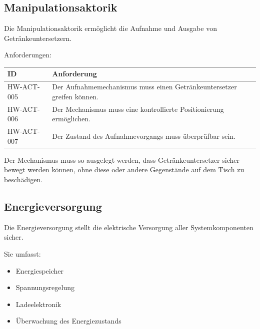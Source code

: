 \documentclass[
  a4paper,
  12pt,
  DIV=12,        %
  parskip=half,  %
  headings=small %
]{scrartcl}
\theoremstyle{definition}
\providecommand{\tightlist}{%
  \setlength{\itemsep}{0pt}\setlength{\parskip}{0pt}}
\theoremstyle{definition}
\begin{document}
\subsection{Manipulationsaktorik}\label{manipulationsaktorik}

Die Manipulationsaktorik ermöglicht die Aufnahme und Ausgabe von
Getränkeuntersetzern.

Anforderungen:

\begin{longtable}[]{@{}
  >{\raggedright\arraybackslash}p{}
  >{\raggedright\arraybackslash}p{}@{}}
\toprule\noalign{}
\begin{minipage}[b]{\linewidth}\raggedright
ID
\end{minipage} & \begin{minipage}[b]{\linewidth}\raggedright
Anforderung
\end{minipage} \\
\midrule\noalign{}
\endhead
\bottomrule\noalign{}
\endlastfoot
HW-ACT-005 & Der Aufnahmemechanismus muss einen Getränkeuntersetzer
greifen können. \\
HW-ACT-006 & Der Mechanismus muss eine kontrollierte Positionierung
ermöglichen. \\
HW-ACT-007 & Der Zustand des Aufnahmevorgangs muss überprüfbar sein. \\
\end{longtable}

Der Mechanismus muss so ausgelegt werden, dass Getränkeuntersetzer
sicher bewegt werden können, ohne diese oder andere Gegenstände auf dem
Tisch zu beschädigen.

\subsection{Energieversorgung}\label{energieversorgung}

Die Energieversorgung stellt die elektrische Versorgung aller
Systemkomponenten sicher.

Sie umfasst:

\begin{itemize}
\tightlist
\item
  Energiespeicher
\item
  Spannungsregelung
\item
  Ladeelektronik
\item
  Überwachung des Energiezustands
\end{itemize}
\end{document}
